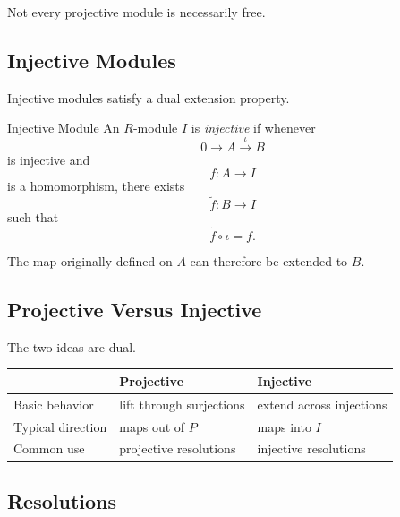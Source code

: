 Not every projective module is necessarily free.

\subsection{Injective Modules}
\label{subsec:injective-modules-homological}

Injective modules satisfy a dual extension property.

\begin{definitionbox}{Injective Module}
An \(R\)-module \(I\) is \emph{injective} if whenever
\[ 0\to A\xrightarrow{\iota}B \]
is injective and
\[ f:A\to I \]
is a homomorphism, there exists
\[ \widetilde f:B\to I \]
such that
\[ \widetilde f\circ\iota=f. \]
\end{definitionbox}

The map originally defined on \(A\) can therefore be extended to \(B\).

\subsection{Projective Versus Injective}
\label{subsec:projective-vs-injective}

The two ideas are dual.

\begin{center}
\begin{tabularx}{0.94\textwidth}{@{}lXX@{}}
\toprule
 & \textbf{Projective} & \textbf{Injective}\\
\midrule
Basic behavior & lift through surjections & extend across injections\\
Typical direction & maps out of \(P\) & maps into \(I\)\\
Common use & projective resolutions & injective resolutions\\
\bottomrule
\end{tabularx}
\end{center}

\subsection{Resolutions}
\label{subsec:resolutions}

